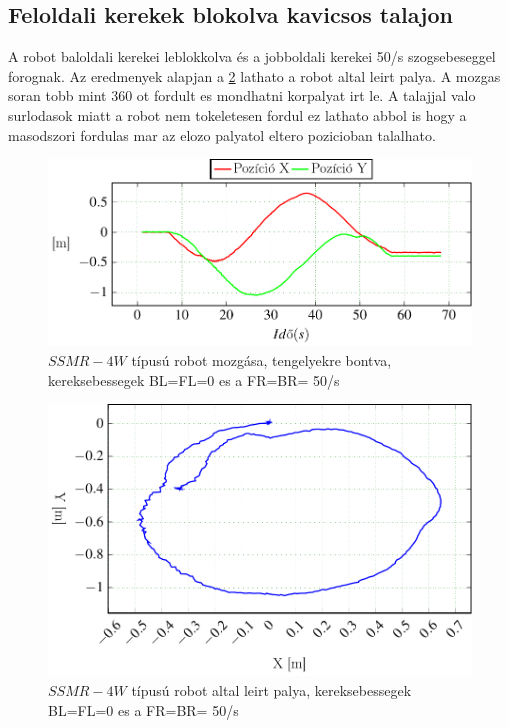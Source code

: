 \subsection{Feloldali kerekek blokolva kavicsos talajon}

A robot baloldali kerekei leblokkolva és a jobboldali kerekei 50\degree/s szogsebeseggel forognak. Az eredmenyek alapjan a \ref{fig:Left0Right50b} lathato a robot altal leirt palya. A mozgas soran tobb mint 360 \degree ot fordult es mondhatni korpalyat irt le. A talajjal valo surlodasok miatt a robot nem tokeletesen fordul ez lathato abbol is hogy a masodszori fordulas mar az elozo palyatol eltero pozicioban talalhato. 

\renewcommand{\GlobalPath}{Meresek/Mozgasok/HibasMukodes/R_0_L_1/}
\renewcommand{\secondImage}{*}

%

%

\begin{figure}[H]
  \includegraphics{tikz/Left0Right50a.pdf}
  \caption{$SSMR-4W$ típusú robot mozgása, tengelyekre bontva, kereksebessegek BL=FL=0 es a FR=BR= 50\degree/s}
    \label{fig:Left0Right50a}
\end{figure}


\begin{figure}[H]
  \includegraphics{tikz/Left0Right50b.pdf}
  \caption{$SSMR-4W$ típusú robot altal leirt palya, kereksebessegek BL=FL=0 es a FR=BR= 50\degree/s}
  \renewcommand{\figlabel}{Left0Right50b}
  \label{fig:Left0Right50b}
\end{figure}


